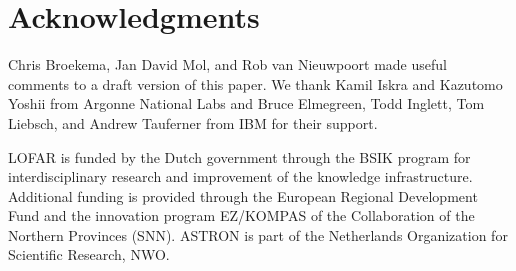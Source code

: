 \documentclass[conference]{worldcomp}
\begin{document}



\section*{Acknowledgments}

Chris Broekema, Jan David Mol, and Rob van Nieuwpoort made useful comments to
a draft version of this paper.
We thank Kamil Iskra and Kazutomo Yoshii from Argonne National Labs and 
Bruce Elmegreen, Todd Inglett, Tom Liebsch, and Andrew Tauferner from IBM for
their support.

LOFAR is funded by the Dutch government through the
BSIK program for interdisciplinary research and
improvement of the knowledge infrastructure. Additional
funding is provided through the European Regional
Development Fund and the innovation program
EZ/KOMPAS of the Collaboration of the Northern
Provinces (SNN). ASTRON is part of the Netherlands
Organization for Scientific Research, NWO.





\end{document}
